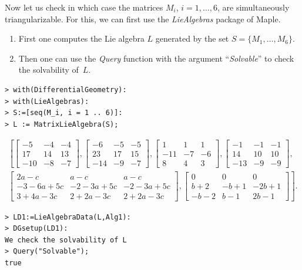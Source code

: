 \documentclass[pdftex]{sigma}
\numberwithin{equation}{section}
\begin{document}
\begin{Example}
Now let us check in which case the matrices $M_i$, $i=1,\dots,6$, are simultaneously triangularizable. For this, we can first use the {\em LieAlgebras} package of Maple.
\begin{enumerate}	\itemsep=0pt
	\item First one computes the Lie algebra $L$ generated by the set $S=\{M_1,\ldots,M_6\}$.
	\item Then one can use the {\em Query} function with the argument ``{\em Solvable}'' to check the solvability of~$L$.
\end{enumerate}
\begin{verbatim}
> with(DifferentialGeometry):
> with(LieAlgebras):
> S:=[seq(M_i, i = 1 .. 6)]:
> L := MatrixLieAlgebra(S);
\end{verbatim}
\begin{gather*}\left[ \left[ \begin{matrix} -5&-4&-4 \\ 17&14&13
	\\ -10&-8&-7 \end{matrix} \right] ,
	\left[\begin{matrix} -6&-5&-5 \\ 23&17&15
	\\ -14&-9&-7 \end{matrix} \right] ,
	\left[\begin{matrix} 1&1&1 \\ -11&-7&-6
	\\ 8&4&3 \end{matrix} \right],
	\left[ \begin{matrix} -1&-1&-1
	\\ 14&10&10 \\ -13&-9&-9
	\end{matrix} \right], \right.\\
	\left.\left[ \begin{matrix} 2 a-c&a-c&a-c \\ -3-6 a+5 c&-2-3 a+5 c&-2-3 a+5 c
	\\ 3+4 a-3 c&2+2 a-3 c&2+2 a-3 c
	\end{matrix} \right] , \left[ \begin{matrix} 0&0&0
	\\ b+2&-b+1&-2 b+1\\ -b-2&b-1&2 b-1
	\end{matrix}\right] \right].
 \end{gather*}
\begin{verbatim}
> LD1:=LieAlgebraData(L,Alg1):
> DGsetup(LD1):
We check the solvability of L
> Query("Solvable");
true
\end{verbatim}


\end{Example}
\end{document}
